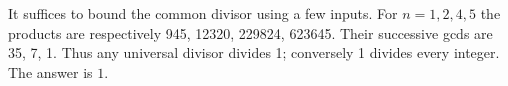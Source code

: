 It suffices to bound the common divisor using a few inputs. For $ n=1,2,4,5 $ the products are respectively 945, 12320, 229824, 623645. Their successive gcds are 35, 7, 1. Thus any universal divisor divides 1; conversely 1 divides every integer. The answer is $\boxed1 $.
